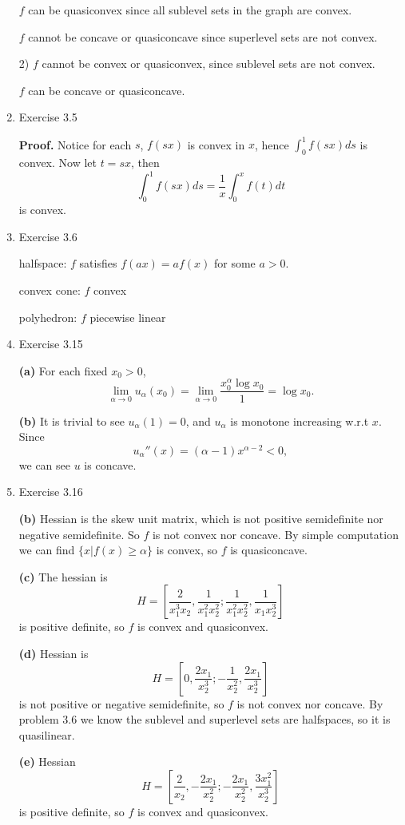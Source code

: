 \documentclass{article}%
\begin{document}
\begin{enumerate}
$f$ can be quasiconvex since all sublevel sets in the graph are convex.

$f$ cannot be concave or quasiconcave since superlevel sets are not convex.

2) $f$ cannot be convex or quasiconvex, since sublevel sets are not convex.

$f$ can be concave or quasiconcave.

\item Exercise 3.5

\textbf{Proof.} Notice for each $s$, $f(sx)$ is convex in $x$, hence $\int_0^1 f(sx)ds $ is convex. Now let $t = sx$, then 
$$
\int_0^1 f(sx)ds = \frac{1}{x}\int_0^x f(t)dt
$$
is convex.

\item Exercise 3.6

halfspace: $f$ satisfies $f(ax) = af(x)$ for some $a > 0$.

convex cone: $f$ convex

polyhedron: $f$ piecewise linear 

\item Exercise 3.15

\textbf{(a)} For each fixed $x_0 > 0$, 
$$
\lim_{\alpha\to 0}u_{\alpha}(x_0) = \lim_{\alpha\to 0}\frac{x_0^\alpha\log x_0}{1} = \log x_0.
$$

\textbf{(b)} It is trivial to see $u_\alpha(1) = 0 $, and $u_\alpha $ is monotone increasing w.r.t $x$. Since
$$
u_\alpha''(x) = (\alpha-1)x^{\alpha-2} < 0,
$$
we can see $u$ is concave.

\item Exercise 3.16

\textbf{(b)} Hessian is the skew unit matrix, which is not positive semidefinite nor negative semidefinite. So $f$ is not convex nor concave. By simple computation we can find $\{x| f(x) \ge \alpha\}$ is convex, so $f$ is quasiconcave.

\textbf{(c)} The hessian is
$$
H = [\frac{2}{x_1^3x_2}, \frac{1}{x_1^2x_2^2}; \frac{1}{x_1^2x_2^2}, \frac{1}{x_1x_2^3}] 
$$
is positive definite, so $f$ is convex and quasiconvex.

\textbf{(d)} Hessian is 
$$
H = [0, \frac{2x_1}{x_2^3}; -\frac{1}{x_2^2}, \frac{2x_1}{x_2^3}]
$$
is not positive or negative semidefinite, so $f$ is not convex nor concave. By problem 3.6 we know the sublevel and superlevel sets are halfspaces, so it is quasilinear.

\textbf{(e)} Hessian
$$
H = [\frac{2}{x_2}, -\frac{2x_1}{x_2^2}; -\frac{2x_1}{x_2^2}, \frac{3x_1^2}{x_2^3}]
$$
is positive definite, so $f$ is convex and quasiconvex.


\end{enumerate}
\end{document}
